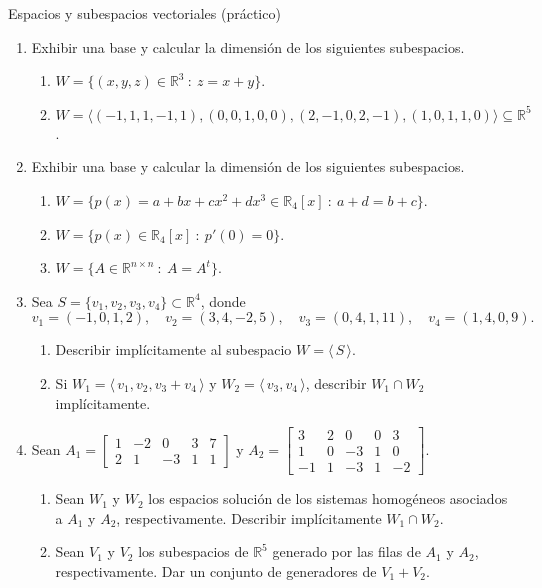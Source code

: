 \begin{chapter}{Espacios y subespacios vectoriales (práctico)}
\begin{enumerate}[resume, topsep=6pt, itemsep=.4cm]
\item  Exhibir una base y calcular la dimensión de los siguientes subespacios.

\begin{enumerate}
    \item $W=\{(x,y,z) \in \mathbb{R}^3 \ : \ z = x + y \}$.
    \item $W = \langle (-1, 1, 1, -1, 1),  (0, 0, 1, 0, 0), (2, -1, 0, 2, -1), (1, 0, 1, 1, 0) \rangle \subseteq \mathbb R^5$.
\end{enumerate}


\item Exhibir una base y calcular la dimensión de los siguientes subespacios.
\begin{enumerate}
    \item $W = \{ p(x)=a+bx+cx^2+dx^3\in \mathbb{R}_{4}[x] \ : \ a+d=b+c \}$.
\item $W= \{ p(x)\in \mathbb{R}_{4}[x] \ : \ p'(0)=0 \}$.
    \item $W = \{A \in \mathbb{R}^{n\times n} \ : \ A = A^t\}$.
\end{enumerate}

    \item Sea  $S=\{v_1,v_2,v_3,v_4\}\subset\mathbb R^4$, donde
$$v_1=(-1,0,1,2), \quad v_2=(3,4,-2,5), \quad v_3=(0,4,1,11), \quad v_4=(1,4,0,9).$$
\begin{enumerate}
    \item  Describir implícitamente al subespacio  $W= \langle \, S\, \rangle$.
    \item Si $W_1 = \langle \, v_1,v_2,v_3+v_4\, \rangle $ y $W_2 = \langle \, v_3,v_4\, \rangle $,
    describir $W_1\cap W_2$ implícitamente.
\end{enumerate}


\item\label{matrices} Sean
    $
    A_1=\begin{bmatrix}
    1&-2&0&3&7\\
    2&1&-3&1&1
    \end{bmatrix}$ y $A_2=\begin{bmatrix}
    3&2&0&0&3\\
    1&0&-3&1&0 \\
    -1&1&-3&1&-2
    \end{bmatrix}
    $.
    
    \begin{enumerate}
    \item Sean $W_1$ y $W_2$ los espacios solución de los sistemas
    homogéneos asociados a $A_1$ y $A_2$, respectivamente.  Describir implícitamente $W_1\cap W_2$.
    \item Sean $V_1$ y $V_2$ los subespacios de $\mathbb{R}^5$ generado por las filas de $A_1$ y $A_2$, respectivamente. Dar un conjunto de generadores de $V_1+V_2$.
    \end{enumerate}



\end{enumerate}
\end{chapter}
